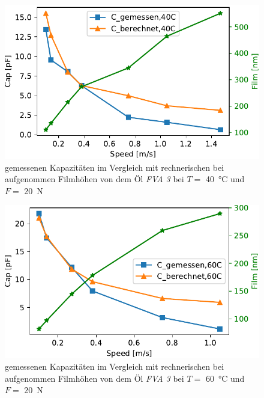 \begin{figure}[htb]
    \centering
    \includegraphics[]{./images/cap_theo_meas_vs_speed_40C.pdf}
    \caption{gemessenen Kapazitäten im Vergleich mit rechnerischen bei aufgenommen Filmhöhen von dem Öl \textit{FVA 3} bei $T =$ \SI{40}{\degreeCelsius} und $F =$ \SI{20}{\N}}
    \label{fig:cap_meas_cap_theo_40C}
\end{figure}

\begin{figure}[htb]
    \centering
    \includegraphics[]{./images/cap_theo_meas_vs_speed_60C.pdf}
    \caption{gemessenen Kapazitäten im Vergleich mit rechnerischen bei aufgenommen Filmhöhen von dem Öl \textit{FVA 3} bei $T =$ \SI{60}{\degreeCelsius} und $F =$ \SI{20}{\N}}
    \label{fig:cap_meas_cap_theo_60C}
\end{figure}

